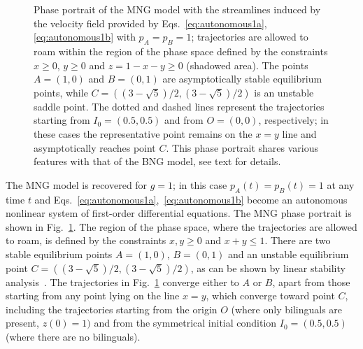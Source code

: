 \documentclass[review]{elsarticle}
\newcommand{\+}{\! + \!}
\begin{document}
\begin{figure}[ht!]
    \caption{
    Phase portrait of the MNG model with the streamlines induced by the velocity field provided by Eqs.~\eqref{eq:autonomous1a}, \eqref{eq:autonomous1b} with $p_A = p_B = 1$;
    trajectories are allowed to roam within the region of the phase space defined by the constraints 
    $x \ge 0$, $y \ge 0$ and $z = 1 - x - y \ge 0$ (shadowed area).
    The points $A=(1,0)$ and $B=(0,1)$ are asymptotically stable equilibrium points, 
    while $C= \left((3-\sqrt{5})/2, (3-\sqrt{5})/2\right)$ is an unstable saddle point. 
    The dotted and dashed lines represent the trajectories starting from $I_0 = (0.5,0.5)$ and from $O = (0,0)$, respectively; 
    in these cases the representative point remains on the $x=y$ line and asymptotically reaches point $C$.
    This phase portrait shares various features with that of the BNG model, see text for details.
}
    \label{fig:phasePortrait}
\end{figure}


The MNG model is recovered for $g = 1$; in this case $p_A(t) = p_B(t) = 1$ at any time $t$ and Eqs.~\eqref{eq:autonomous1a},~\eqref{eq:autonomous1b} become an autonomous nonlinear system of first-order differential equations. 
The MNG phase portrait is shown in Fig.~\ref{fig:phasePortrait}.
The region of the phase space, where the trajectories are allowed to roam, is defined by the constraints $x,y \ge 0$ and $x + y \le 1$.
There are two stable equilibrium points $A=(1,0)$, $B=(0,1)$ and an unstable equilibrium point $C=((3-\sqrt{5})/2,(3-\sqrt{5})/2)$, as can be shown by linear stability analysis~\cite{Baronchelli-2006a}.
The trajectories in Fig.~\ref{fig:phasePortrait} converge either to $A$ or $B$, apart from those starting from any point lying on the line $x=y$, which converge toward point $C$, including the trajectories starting from the origin $O$ (where only bilinguals are present, $z(0) = 1)$ and from the symmetrical initial condition $I_0 = (0.5,0.5)$  (where there are no bilinguals).
\end{document}
